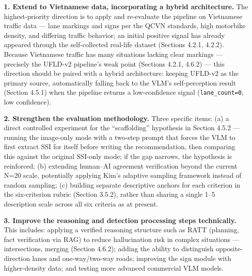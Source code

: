 \documentclass[12pt,a4paper]{report}
\begin{document}
\textbf{1. Extend to Vietnamese data, incorporating a hybrid architecture.} The highest-priority direction is to apply and re-evaluate the pipeline on Vietnamese traffic data --- lane markings and signs per the QCVN standards, high motorbike density, and differing traffic behavior; an initial positive signal has already appeared through the self-collected real-life dataset (Sections 4.2.1, 4.2.2). Because Vietnamese traffic has many situations lacking clear markings --- precisely the UFLD-v2 pipeline's weak point (Sections 4.2.1, 4.6.2) --- this direction should be paired with a hybrid architecture: keeping UFLD-v2 as the primary source, automatically falling back to the VLM's self-perception result (Section 4.5.1) when the pipeline returns a low-confidence signal (\texttt{lane\_count=0}, low confidence).

\textbf{2. Strengthen the evaluation methodology.} Three specific items: (a) a direct controlled experiment for the ``scaffolding'' hypothesis in Section 4.5.2 --- running the image-only mode with a two-step prompt that forces the VLM to first extract SSI for itself before writing the recommendation, then comparing this against the original SSI-only mode; if the gap narrows, the hypothesis is reinforced; (b) extending human--AI agreement verification beyond the current N=20 scale, potentially applying Kim's \cite{kim2026augmenting} adaptive sampling framework instead of random sampling; (c) building separate descriptive anchors for each criterion in the six-criterion rubric (Section 3.5.2), rather than sharing a single 1--5 description scale across all six criteria as at present.

\textbf{3. Improve the reasoning and detection processing steps technically.} This includes: applying a verified reasoning structure such as RATT \cite{zhang2025ratt} (planning, fact verification via RAG) to reduce hallucination risk in complex situations --- intersections, merging (Section 4.6.2); adding the ability to distinguish opposite-direction lanes and one-way/two-way roads; improving the sign module with higher-density data; and testing more advanced commercial VLM models.

\clearpage
{}


\end{document}
